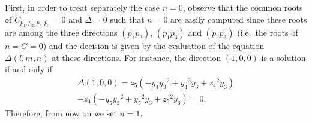\documentclass[5p]{elsarticle}
\newcommand{\com}[1]{{\color{black} #1}}
\begin{document}
\medskip

First, in order to treat \com{separately} the case $n=0$, observe that the common roots of $C_{p_1,p_2,p_3,p_5}=0$ and $\Delta=0$ such that $n=0$ are easily computed since \com{these roots} are among the three directions $(p_{1}p_{2})$, $(p_{1}p_{3})$ and $(p_{2}p_{3})$ (i.e.~the roots of $n=G=0$) and the decision is given by the evaluation of the equation $\Delta(l,m,n)$ at these directions. For instance, the direction $(1,0,0)$ is a solution if and only if 
\begin{multline*}
\Delta(1,0,0)= z_5\left(-{ y_4}{{ y_3}}^{2}+{{ y_4}}^{2}{ y_3}+{{ z_4}}^{2
 }{ y_3} \right) \\ - z_4\left( -{ y_5}{{ y_3}}^{2}+{{ y_5}}^{2}{ y_3}+{{ z_5}}^{2
 }{ y_3} \right)=0.	
\end{multline*}
Therefore, from now on we set $n=1$. 
\end{document}
